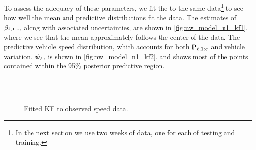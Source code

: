 To assess the adequacy of these parameters, we fit the \kf{} to the same data\footnote{In the next section we use two weeks of data, one for each of testing and training.} to see how well the mean and predictive distributions fit the data. The estimates of $\beta_{\ell,1:c}$, along with associated uncertainties, are shown in \cref{fig:nw_model_n1_kf1}, where we see that the mean approximately follows the center of the data. The predictive vehicle speed distribution, which accounts for both $\mathbf{P}_{\ell,1:c}$ and vehicle variation, $\mathbf{\boldsymbol{\psi}}_{\ell}$, is shown in \cref{fig:nw_model_n1_kf2}, and shows most of the points contained within the 95\% posterior predictive region.


\begin{knitrout}\small
{}\color{fgcolor}\begin{figure}

{\centering {}\\
\\

}

\caption[Fitted KF to observed speed data]{Fitted KF to observed speed data.}\label{fig:nw_model_n1_kf}
\end{figure}


\end{knitrout}



